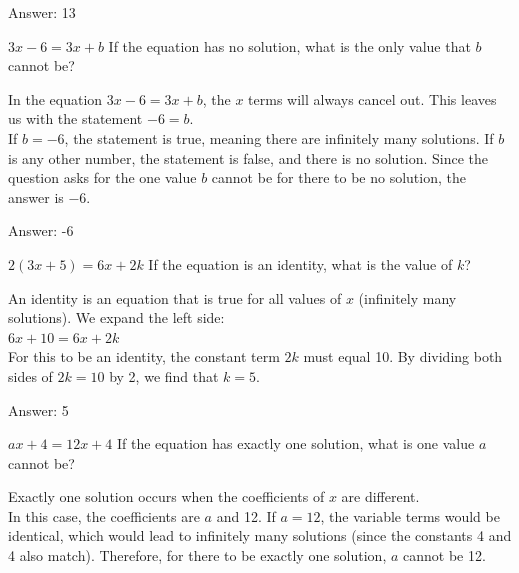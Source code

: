 \documentclass[11pt,paper=a4,answers]{exam}
\begin{document}
\begin{questions}
\begin{solution}
\vspace{20pt}
Answer: \colorbox{yellow!100}{13}
\end{solution}

\question
$3x - 6 = 3x + b$
If the equation has no solution, what is the only value that $b$ cannot be?

\begin{solution}
In the equation $3x - 6 = 3x + b$, the $x$ terms will always cancel out. This leaves us with the statement $-6 = b$. 
\\[10pt]
If $b = -6$, the statement is true, meaning there are infinitely many solutions. If $b$ is any other number, the statement is false, and there is no solution. Since the question asks for the one value $b$ cannot be for there to be no solution, the answer is $-6$.

\vspace{20pt}
Answer: \colorbox{yellow!100}{-6}
\end{solution}

\question
$2(3x + 5) = 6x + 2k$
If the equation is an identity, what is the value of $k$?

\begin{solution}
An identity is an equation that is true for all values of $x$ (infinitely many solutions). We expand the left side:
\\[10pt]
$6x + 10 = 6x + 2k$
\\[10pt]
For this to be an identity, the constant term $2k$ must equal 10. By dividing both sides of $2k = 10$ by 2, we find that $k = 5$.

\vspace{20pt}
Answer: \colorbox{yellow!100}{5}
\end{solution}

\question
$ax + 4 = 12x + 4$
If the equation has exactly one solution, what is one value $a$ cannot be?

\begin{solution}
Exactly one solution occurs when the coefficients of $x$ are different. 
\\[10pt]
In this case, the coefficients are $a$ and 12. If $a = 12$, the variable terms would be identical, which would lead to infinitely many solutions (since the constants 4 and 4 also match). Therefore, for there to be exactly one solution, $a$ cannot be 12.


\end{solution}
\end{questions}
\end{document}
